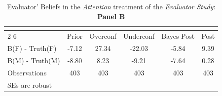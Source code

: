 \begin{table}[htbp]\centering
\caption{Evaluator' Beliefs in the \textit{Attention} treatment of the \textit{Evaluator Study}: \textbf{Panel B}}
\begin{tabular}{l*{5}{c}}
\hline\hline
                &\multicolumn{5}{c}{}                             \\\cmidrule(lr){2-6}
                &\multicolumn{1}{c}{Prior}&\multicolumn{1}{c}{Overconf}&\multicolumn{1}{c}{Underconf}&\multicolumn{1}{c}{Bayes Post}&\multicolumn{1}{c}{Post}\\
\hline
B(F) - Truth(F) &    -7.12&    27.34&   -22.03&    -5.84&     9.39\\
B(M) - Truth(M) &    -8.80&     8.23&    -9.21&    -7.64&     0.28\\
\hline
Observations    &      403&      403&      403&      403&      403\\
\hline\hline
\multicolumn{6}{l}{\footnotesize SEs are robust}\\
\end{tabular}
\end{table}
